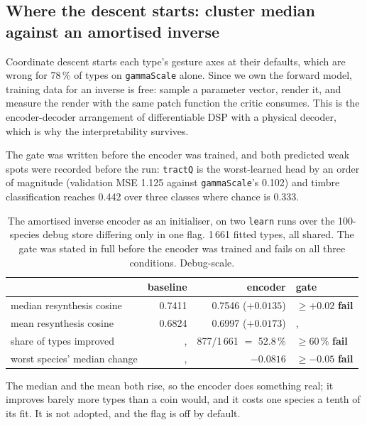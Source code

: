 \documentclass[10pt,twocolumn,a4paper]{article}
\begin{document}
\subsection{Where the descent starts: cluster median against an amortised inverse}

Coordinate descent starts each type's gesture axes at their defaults, which are wrong for
78\,\% of types on \texttt{gammaScale} alone. Since we own the forward model, training data
for an inverse is free: sample a parameter vector, render it, and measure the render with
the same patch function the critic consumes. This is the encoder-decoder arrangement of
differentiable DSP \citep{ddsp2020} with a physical decoder, which is why the
interpretability survives.

The gate was written before the encoder was trained, and both predicted weak spots were
recorded before the run: \texttt{tractQ} is the worst-learned head by an order of magnitude
(validation MSE 1.125 against \texttt{gammaScale}'s 0.102) and timbre classification reaches
0.442 over three classes where chance is 0.333.

\begin{table}[t]
\centering
\small
\caption{The amortised inverse encoder as an initialiser, on two \texttt{learn} runs over
the 100-species debug store differing only in one flag. 1\,661 fitted types, all shared. The
gate was stated in full before the encoder was trained and fails on all three conditions.
Debug-scale.}
\label{tab:inverse}
\begin{tabular}{L{6.4cm} r r L{3.0cm}}
\toprule
& baseline & encoder & gate \\
\midrule
median resynthesis cosine & 0.7411 & 0.7546 \; ($+0.0135$) & $\ge +0.02$ \quad \textbf{fail} \\
mean resynthesis cosine & 0.6824 & 0.6997 \; ($+0.0173$) &, \\
share of types improved &, & 877/1\,661 $=$ 52.8\,\% & $\ge 60\,\%$ \quad \textbf{fail} \\
worst species' median change &, & $-0.0816$ & $\ge -0.05$ \quad \textbf{fail} \\
\bottomrule
\end{tabular}
\end{table}

The median and the mean both rise, so the encoder does something real; it improves barely
more types than a coin would, and it costs one species a tenth of its fit. It is not
adopted, and the flag is off by default.
\end{document}
